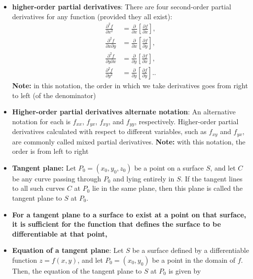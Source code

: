 \documentclass{report}
\begin{document}
\begin{itemize}
            \item \textbf{higher-order partial derivatives}:
                There are four second-order partial derivatives for any function (provided they all exist):
                \begin{align*}
                    \frac{\partial^2 f}{\partial x^2} &= \frac{\partial}{\partial x}\left[\frac{\partial f}{\partial x}\right], \\
                    \frac{\partial^2 f}{\partial x \partial y} &= \frac{\partial}{\partial x}\left[\frac{\partial f}{\partial y}\right], \\
                    \frac{\partial^2 f}{\partial y \partial x} &= \frac{\partial}{\partial y}\left[\frac{\partial f}{\partial x}\right], \\
                    \frac{\partial^2 f}{\partial y^2} &= \frac{\partial}{\partial y}\left[\frac{\partial f}{\partial y}\right].
                .\end{align*}
                \bigbreak \noindent 
                \textbf{Note:} in this notation, the order in which we take derivatives goes from right to left (of the denominator)
            \item \textbf{Higher-order partial derivatives alternate notation}:
                An alternative notation for each is $f_{xx}$, $f_{yx}$, $f_{xy}$, and $f_{yy}$, respectively. Higher-order partial derivatives calculated with respect to different variables, such as $f_{xy}$ and $f_{yx}$, are commonly called mixed partial derivatives.
                \bigbreak \noindent 
                \textbf{Note:} with this notation, the order is from left to right
            \item \textbf{Tangent plane:} Let $P_0=(x_0,y_0,z_0)$ be a point on a surface $S$, and let $C$ be any curve passing through $P_0$ and lying entirely in $S$. If the tangent lines to all such curves $C$ at $P_0$ lie in the same plane, then this plane is called the tangent plane to $S$ at $P_0$.
                \bigbreak \noindent 
            \item \textbf{For a tangent plane to a surface to exist at a point on that surface, it is sufficient for the function that defines the surface to be differentiable at that point,}
            \item \textbf{Equation of a tangent plane}: Let \(S\) be a surface defined by a differentiable function \(z = f(x, y)\), and let \(P_0 = (x_0, y_0)\) be a point in the domain of \(f\). Then, the equation of the tangent plane to \(S\) at \(P_0\) is given by

\end{itemize}
\end{document}
